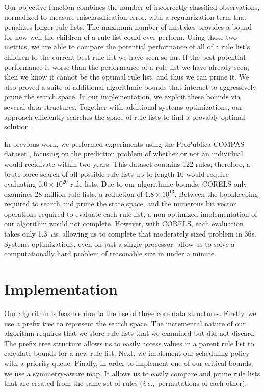 \documentclass[format=sigconf]{acmart}
\def\ie{{\it i.e.},~}
\begin{document}
Our objective function combines the number of incorrectly classified observations, normalized to measure misclassification error, with a regularization term that penalizes longer rule lists.
The maximum number of mistakes provides a bound for how well the children of a rule list could ever perform.
Using those two metrics, we are able to compare the potential performance of all of a rule list's children to the current best rule list we have seen so far.
If the best potential performance is worse than the performance of a rule list we have already seen, then we know it cannot be the optimal rule list, and thus we can prune it.
We also proved a suite of additional algorithmic bounds that interact to aggressively prune the search space.
In our implementation, we exploit these bounds via several data structures.  
Together with additional systems optimizations, our approach efficiently searches the space of rule lists to find a provably optimal solution.

In previous work, we performed experiments using the ProPublica COMPAS dataset \cite{LarsonMaKiAn16}, focusing on the prediction problem of whether or not an individual would recidivate within two years.
This dataset contains 122 rules; therefore, a brute force search of all possible rule lists up to length 10 would require evaluating ${5.0 \times 10^{20}}$ rule lists.
Due to our algorithmic bounds, CORELS only examines 28 million rule lists, a reduction of ${1.8 \times 10^{13}}$.
Between the bookkeeping required to search and prune the state space, and the numerous bit vector operations required to evaluate each rule list, a non-optimized implementation of our algorithm would not complete.
However, with CORELS, each evaluation takes only 1.3~$\mu$s, allowing us to complete that moderately sized problem in 36s.
Systems optimizations, even on just a single processor, allow us to solve a computationally hard problem of reasonable size in under a minute.

\section{Implementation}
Our algorithm is feasible due to the use of three core data structures.
Firstly, we use a prefix tree to represent the search space.
The incremental nature of our algorithm requires that we store rule lists that we examined but did not discard.
The prefix tree structure allows us to easily access values in a parent rule list to calculate bounds for a new rule list.
Next, we implement our scheduling policy with a priority queue.
Finally, in order to implement one of our critical bounds, we use a symmetry-aware map.
It allows us to easily compare and prune rule lists that are created from the same set of rules (\ie permutations of each other).
\end{document}
